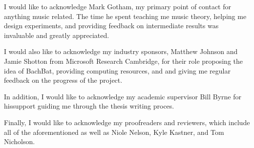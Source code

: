 
\begin{acknowledgements}

 I would like to acknowledge Mark Gotham, my primary point of contact for
 anything music related. The time he spent teaching me music theory,
 helping me design experiments, and providing feedback on intermediate results
 was invaluable and greatly appreciated.

 I would also like to acknowledge my industry sponsors, Matthew Johnson and
 Jamie Shotton from Microsoft Research Cambridge, for their role proposing the
 idea of BachBat, providing computing resources, and and giving me regular
 feedback on the progress of the project.

 In addition, I would like to acknowledge my academic supervisor Bill Byrne
 for hissupport guiding me through the thesis writing proces.

 Finally, I would like to acknowledge my proofreaders and reviewers, which
 include all of the aforementioned as well as Niole Nelson, Kyle Kastner, and
 Tom Nicholson.

\end{acknowledgements}
